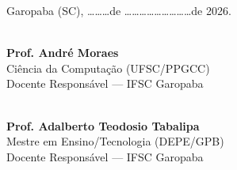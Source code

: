 \documentclass[12pt,a4paper]{article}
\begin{document}
\vspace{1.2cm}

\begin{center}
\small
Garopaba (SC), \dots\dots\dots de \dots\dots\dots\dots\dots\dots\dots\dots\dots de 2026.

\vspace{1.8cm}

\begin{minipage}{0.45\textwidth}
\centering
\hrulefill \\
\textbf{Prof. André Moraes}\\
Ciência da Computação (UFSC/PPGCC)\\
Docente Responsável — IFSC Garopaba
\end{minipage}
\hfill
\begin{minipage}{0.45\textwidth}
\centering
\hrulefill \\
\textbf{Prof. Adalberto Teodosio Tabalipa}\\
Mestre em Ensino/Tecnologia (DEPE/GPB)\\
Docente Responsável — IFSC Garopaba
\end{minipage}
\end{center}
\end{document}
